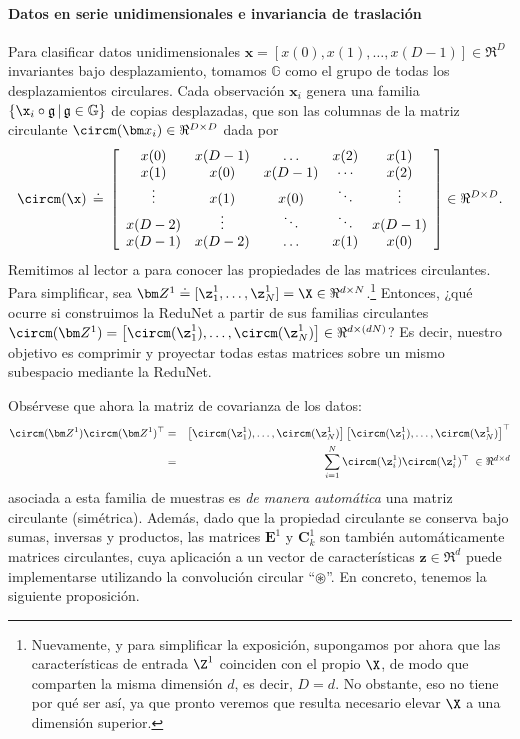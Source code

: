\documentclass[../../book-main.tex]{subfiles}
\begin{document}
\paragraph{Datos en serie unidimensionales e invariancia de traslación} Para clasificar
datos unidimensionales $\bm x = [x(0), x(1), \ldots, x(D-1)] \in \Re^D$
invariantes bajo desplazamiento, tomamos $\mathbb{G}$ como el grupo de todas los
desplazamientos circulares. Cada observación $\bm x_i$ genera una familia $\{
\x_i \circ \mathfrak{g} \, | \, \mathfrak{g} \in \mathbb G \}$ de
copias desplazadas, que son las columnas de la matriz circulante
$\circm(\bm x_i) \in \Re^{D \times D}$ dada por
\begin{equation}
    \circm(\x) \,\doteq\, \left[
        \begin{array}{ccccc} x(0) & x(D-1) & \dots & x(2) & x(1)
            \\ x(1) & x(0) & x(D-1) & \cdots & x(2) \\ \vdots & x(1)
            & x(0) &\ddots & \vdots \\ x(D-2) &  \vdots & \ddots &
            \ddots & x(D-1) \\ x(D-1) & x(D-2) & \dots & x(1) & x(0)
    \end{array} \right]  \in \Re^{D \times D}.
\end{equation}
Remitimos al lector a \cite{Kra2012OnCM} para conocer las propiedades de las matrices circulantes.
Para simplificar, sea $\bm Z^1 \doteq [ \z_{1}^1, \dots,
\z_{N}^1 ] = \X \in \Re^{d \times N}$.\footnote{Nuevamente, y para simplificar la exposición, 
    supongamos por ahora que las características de entrada $\Z^1$ coinciden con el propio $\X$, 
    de modo que comparten la misma dimensión $d$, es decir, $D=d$. No obstante, eso no tiene por 
    qué ser así, ya que pronto veremos que resulta necesario 
elevar $\X$ a una dimensión superior.} Entonces, ¿qué ocurre si construimos
la ReduNet a partir de sus familias circulantes $\circm(\bm Z^1) = \left[
\circm(\z_{1}^1), \dots, \circm(\z_{N}^1) \right] \in \Re^{d \times
(dN)}$? Es decir, nuestro objetivo es comprimir y proyectar todas estas matrices sobre un mismo
subespacio mediante la ReduNet.

Obsérvese que ahora la matriz de covarianza de los datos:
\begin{eqnarray}
    \circm(\bm Z^1) \circm(\bm Z^1)^\top
    &=& \left[ \circm(\z_{1}^1), \dots, \circm(\z_{N}^1) \right]
    \left[ \circm(\z_{1}^1), \dots, \circm (\z_{N}^1) \right]^\top \nonumber \\
    &=& \sum_{i =1}^N \circm(\z_{i}^1) \circm(\z_{i}^1)^\top \;\in
    \Re^{d\times d}
\end{eqnarray}
asociada a esta familia de muestras es {\em de manera automática} una
matriz circulante (simétrica). Además, dado que la propiedad circulante
se conserva bajo sumas, inversas y productos, las
matrices $\bm E^1$ y $\bm C^1_k$ son también automáticamente matrices circulantes,
cuya aplicación a un vector de características $\bm z \in \Re^d$ puede
implementarse utilizando la convolución circular ``$\circledast$''.
En concreto, tenemos la siguiente proposición.
\end{document}

